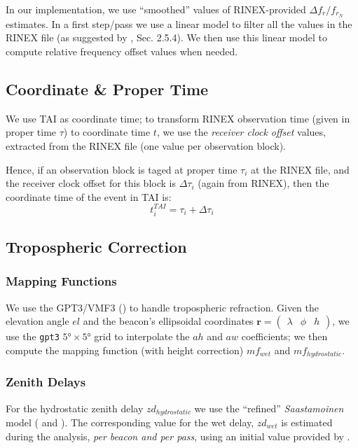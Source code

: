 In our implementation, we use ``smoothed'' values of RINEX-provided 
$\Delta f_r / f_{r_N}$ estimates. In a first step/pass we use a linear model 
to filter all the values in the RINEX file (as suggested by \cite{lemoine-2016}, 
Sec. 2.5.4). We then use this linear model to compute relative frequency offset 
values when needed. 

\subsection{Coordinate \& Proper Time}
\label{ssec:coordinate-proper-time}
We use TAI as coordinate time; to transform RINEX observation time (given in 
proper time $\tau$) to coordinate time $t$, we use the \emph{receiver clock 
offset} values, extracted from the RINEX file (one value per observation block).

Hence, if an observation block is taged at proper time $\tau _i$ at the RINEX 
file, and the receiver clock offset for this block is $\Delta \tau _i$ (again from 
RINEX), then the coordinate time of the event in TAI is:
\begin{equation}
  t^{TAI}_i = \tau _i + \Delta \tau _i
\end{equation}

\subsection{Tropospheric Correction}
\label{ssec-tropospheric-correction}

\subsubsection{Mapping Functions}
We use the GPT3/VMF3 (\cite{Landskron2018}) to handle tropospheric refraction. 
Given the elevation angle $el$ and the beacon's ellipsoidal coordinates 
$\bm{r}=\begin{pmatrix} \lambda & \phi & h\end{pmatrix}$, we use the \texttt{gpt3} 
$\ang{5} \times \ang{5}$ grid to interpolate the $ah$ and $aw$ coefficients; 
we then compute the mapping function (with height correction) $mf_{wet}$ and 
$mf_{hydrostatic}$.

\subsubsection{Zenith Delays}
For the hydrostatic zenith delay $zd_{hydrostatic}$ we use the ``refined'' 
\emph{Saastamoinen} model (\cite{Davisetal85} and \cite{Saastamoinen72}). 
The corresponding value for the wet delay, $zd_{wet}$ is estimated during the 
analysis, \emph{per beacon and per pass}, using an initial value provided by 
\cite{Askneetal87}.

